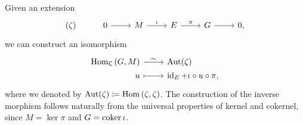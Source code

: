 \begin{rem}[]\label{rem:CorrExtAutMor}
	Given an extension
	\begin{equation*}
	\begin{tikzcd}
		(\zeta) &
		0 \arrow[r, "", rightarrow] &
		M \arrow[r, "\iota", rightarrow] &
		E \arrow[r, "\pi", rightarrow] &
		G \arrow[r, "", rightarrow] &
		0
	,\end{tikzcd}
	\end{equation*}
	we can construct an isomorphism
	\begin{equation*}
	\begin{tikzcd}[row sep = 0ex
		,/tikz/column 1/.append style={anchor=base east}
		,/tikz/column 2/.append style={anchor=base west}]
		\Hom_{\mathsf{C}} \left( G, M \right)
		\arrow[r, "\sim", rightarrow] &
		\mathrm{Aut}(\zeta) \\
		u \arrow[r, "", mapsto] & 
		\id_{ E } + \iota \circ u \circ \pi
	,\end{tikzcd}
	\end{equation*} 
	where we denoted by $\mathrm{Aut}(\zeta) \coloneqq \operatorname{Hom} \left( \zeta, \zeta \right)$.
	The construction of the inverse morphism follows naturally from the 
	universal properties of kernel and cokernel, since $M = \ker \pi$
	and $G = \operatorname{coker} \iota$.
\end{rem}


